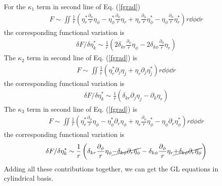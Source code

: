 \documentclass[aps,prl,preprint]{revtex4-2}
\begin{document}
For the $\kappa_1$ term in second line of Eq. (\ref{fgrad})
\begin{align}
    F\sim\iint\frac{1}{r}\left(
    \eta_r^*\frac{\partial_\phi}{r}\eta_\phi
    -\eta_\phi^*\frac{\partial_\phi}{r}\eta_r
    + \eta_r\frac{\partial_\phi}{r}\eta_\phi^*
    -\eta_\phi\frac{\partial_\phi}{r}\eta_r^*
    \right)r\dd\phi\dd r
\end{align}
the corresponding functional variation is
\begin{align}
    \delta F/\delta\eta_k^*\sim\frac{1}{r}\left(
    2\delta_{kr}\frac{\partial_\phi}{r}\eta_\phi - 2\delta_{k\phi}\frac{\partial_\phi}{r}\eta_r\right)
\end{align}
The $\kappa_2$ term in second line of Eq. (\ref{fgrad}) is
\begin{align}
    F\sim\iint\frac{1}{r}\left(
    \eta_r^*\partial_j\eta_j + \eta_r\partial_j\eta_j^*
    \right)r\dd\phi\dd r
\end{align}
the corresponding functional variation is
\begin{align}
    \delta F/\delta\eta_k^*\sim\frac{1}{r}\left(
    \delta_{kr}\partial_j\eta_j - \partial_k\eta_r\right)
\end{align}
The $\kappa_3$ term in second line of Eq. (\ref{fgrad}) is
\begin{align}
    F\sim\iint\frac{1}{r}\left(
    \eta_r^*\frac{\partial_\phi}{r}\eta_\phi - \eta_\phi^*\partial_r\eta_\phi
    + \eta_r\frac{\partial_\phi}{r}\eta_\phi^* - \eta_\phi\partial_r\eta_\phi^*
    \right)r\dd\phi\dd r
\end{align}
the corresponding functional variation is
\begin{align}
    \delta F/\delta\eta_k^*\sim\frac{1}{r}\left(
    \delta_{kr}\frac{\partial_\phi}{r}\eta_\phi
    \cancel{- \delta_{k\phi}\partial_r\eta_\phi}
    - \delta_{k\phi}\frac{\partial_\phi}{r}\eta_r
    \cancel{+ \delta_{k\phi}\partial_r\eta_\phi}\right)
\end{align}
Adding all these contributions together, we can get the GL equations in cylindrical basis.
\end{document}

